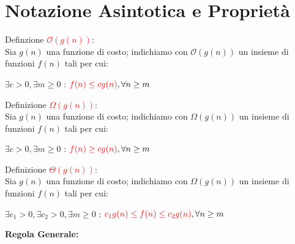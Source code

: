 \documentclass[../cheatSheetAlgoritmi.tex]{subfiles}
\begin{document}
\section{Notazione Asintotica e Proprietà}
Definzione \textcolor{red}{$\mathcal{O}(g(n))$}:\\
Sia $g(n)$ una funzione di costo; indichiamo con $\mathcal{O}(g(n))$ un insieme di funzioni $f(n)$ tali per cui:
\begin{center}
$\exists c > 0, \exists m \geq 0$ : $\textcolor{red}{f(n) \leq cg(n)} , \forall n \geq m$
\end{center}
Definizione \textcolor{red}{$\Omega(g(n))$}:\\
Sia $g(n)$ una funzione di costo; indichiamo con $\Omega(g(n))$ un insieme di funzioni $f(n)$ tali per cui:
\begin{center}
$\exists c > 0, \exists m \geq 0$ : $\textcolor{red}{f(n) \geq cg(n)} , \forall n \geq m$
\end{center}
Definizione \textcolor{red}{$\Theta(g(n))$}:\\
Sia $g(n)$ una funzione di costo; indichiamo con $\Omega(g(n))$ un insieme di funzioni $f(n)$ tali per cui:
\begin{center}
$\exists c_1 > 0, \exists c_2 > 0, \exists m \geq 0$ : $\textcolor{red}{c_1g(n) \leq f(n) \leq c_2g(n)} , \forall n \geq m$
\end{center}
\newpage
\begin{flushleft}
\textbf{Regola Generale:}
\end{flushleft}
\end{document}
